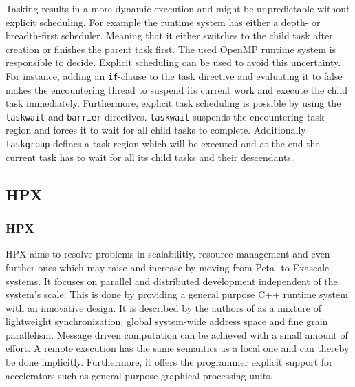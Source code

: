   Tasking results in a more dynamic execution and might be unpredictable without explicit scheduling.
  For example the runtime system has either a depth- or breadth-first scheduler.
  Meaning that it either switches to the child task after creation or finishes the parent task first.
  The used OpenMP runtime system is responsible to decide.
  Explicit scheduling can be used to avoid this uncertainty.
  For instance, adding an \texttt{if}-clause to the task directive and evaluating it to false makes the encountering thread to suspend its current work and execute the child task immediately.
  Furthermore, explicit task scheduling is possible by using the \texttt{taskwait} and \texttt{barrier} directives.
  \texttt{taskwait} suspends the encountering task region and forces it to wait for all child tasks to complete.
  Additionally \texttt{taskgroup} defines a task region which will be executed and at the end the current task has to wait for all its child tasks and their descendants.~\cite{Qawasmeh.2014}~\cite{Furlinger.2009}


\subsection{HPX}
\label{subsec:HPX}
\subsubsection{HPX}
  
  HPX aims to resolve problems in scalabilitiy, resource management and even further ones which may raise and increase by moving from Peta- to Exascale systems.
  It focuses on parallel and distributed development independent of the system's scale.
  This is done by providing a general purpose C++ runtime system with an innovative design.
  It is described by the authors of \cite{Kaiser.2014} as a mixture of lightweight synchronization, global system-wide address space and fine grain parallelism.
  Message driven computation can be achieved with a small amount of effort.
  A remote execution has the same semantics as a local one and can thereby be done implicitly.
  Furthermore, it offers the programmer explicit support for accelerators such as general purpose graphical processing units.~\cite{Kaiser.2014}
  

